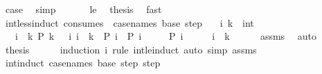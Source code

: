 \begin{isabellebody}
\ {\isacharquery}{\kern0pt}case\ \isamarkupfalse%
\ simp\isanewline
\ \ \isamarkupfalse%
\isanewline
\ \ \isamarkupfalse%
\ le\ \isamarkupfalse%
\ {\isacharquery}{\kern0pt}thesis\ \isamarkupfalse%
\ fast\isanewline
{}\isamarkupfalse%
%
\endisatagproof
{\isafoldproof}%
%
\isadelimproof
\isanewline
%
\endisadelimproof
\isanewline
{}\isamarkupfalse%
\ int{\isacharunderscore}{\kern0pt}less{\isacharunderscore}{\kern0pt}induct\ {\isacharbrackleft}{\kern0pt}consumes\ {}{\isacharcomma}{\kern0pt}\ case{\isacharunderscore}{\kern0pt}names\ base\ step{\isacharbrackright}{\kern0pt}{\isacharcolon}{\kern0pt}\isanewline
\ \ \ i\ k\ {\isacharcolon}{\kern0pt}{\isacharcolon}{\kern0pt}\ int\isanewline
\ \ \ {\isachardoublequoteopen}i\ {\isacharless}{\kern0pt}\ k{\isachardoublequoteclose}\ {\isachardoublequoteopen}P\ {\isacharparenleft}{\kern0pt}k\ {\isacharminus}{\kern0pt}\ {}{\isacharparenright}{\kern0pt}{\isachardoublequoteclose}\ {\isachardoublequoteopen}{\isasymAnd}i{\isachardot}{\kern0pt}\ i\ {\isacharless}{\kern0pt}\ k\ {\isasymLongrightarrow}\ P\ i\ {\isasymLongrightarrow}\ P\ {\isacharparenleft}{\kern0pt}i\ {\isacharminus}{\kern0pt}\ {}{\isacharparenright}{\kern0pt}{\isachardoublequoteclose}\isanewline
\ \ \ {\isachardoublequoteopen}P\ i{\isachardoublequoteclose}\isanewline
%
\isadelimproof
%
\endisadelimproof
%
\isatagproof
{}\isamarkupfalse%
\ {\isacharminus}{\kern0pt}\isanewline
\ \ \isamarkupfalse%
\ {\isachardoublequoteopen}i\ {\isasymle}\ k{\isacharminus}{\kern0pt}{}{\isachardoublequoteclose}\isanewline
\ \ \ \ \isamarkupfalse%
\ assms\ \isamarkupfalse%
\ auto\isanewline
\ \ \isamarkupfalse%
\ \isamarkupfalse%
\ {\isacharquery}{\kern0pt}thesis\isanewline
\ \ \ \ \isamarkupfalse%
\ {\isacharparenleft}{\kern0pt}induction\ i\ rule{\isacharcolon}{\kern0pt}\ int{\isacharunderscore}{\kern0pt}le{\isacharunderscore}{\kern0pt}induct{\isacharparenright}{\kern0pt}\ {\isacharparenleft}{\kern0pt}auto\ simp{\isacharcolon}{\kern0pt}\ assms{\isacharparenright}{\kern0pt}\isanewline
{}\isamarkupfalse%
%
\endisatagproof
{\isafoldproof}%
%
\isadelimproof
\isanewline
%
\endisadelimproof
\isanewline
{}\isamarkupfalse%
\ int{\isacharunderscore}{\kern0pt}induct\ {\isacharbrackleft}{\kern0pt}case{\isacharunderscore}{\kern0pt}names\ base\ step{}\ step{}{\isacharbrackright}{\kern0pt}{\isacharcolon}{\kern0pt}\isanewline

\end{isabellebody}
